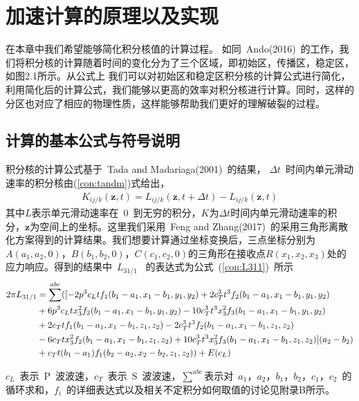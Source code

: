 
\chapter{加速计算的原理以及实现}
    \indent 在本章中我们希望能够简化积分核值的计算过程。 如同~Ando(2016)~的工作，我们将积分核的计算随着时间的变化分为了三个区域，即初始区，传播区，稳定区，如图2.1所示。从公式上 我们可以对初始区和稳定区积分核的计算公式进行简化，利用简化后的计算公式，我们能够以更高的效率对积分核进行计算。同时，这样的分区也对应了相应的物理性质，这样能够帮助我们更好的理解破裂的过程。
	\section{计算的基本公式与符号说明}
   \indent 积分核的计算公式基于~Tada and Madariaga(2001)~的结果， $\Delta t$~时间内单元滑动速率的积分核由(\ref{con:tandm})式给出，
        \begin{align} \label{con:tandm}
              K_{ij/k}(\textbf{z},t)=L_{ij/k}(\textbf{z},t+\Delta t)-L_{ij/k}(\textbf{z},t)
         \end{align}
    其中$L$表示单元滑动速率在~0~到无穷的积分，$K$为$\Delta t$时间内单元滑动速率的积分，$\textbf{z}$为空间上的坐标。这里我们采用~Feng and Zhang(2017)~的采用三角形离散化方案得到的计算结果。我们想要计算通过坐标变换后，三点坐标分别为$A(a_{1},a_{2},0)$，$B(b_{1},b_{2},0)$，$C(c_{1},c_{2},0)$的三角形在接收点$R(x_{1},x_{2},x_{3})$处的应力响应。得到的结果中~$L_{31/1}$~ 的表达式为公式~(\ref{con:L311})~所示
        \begin{align} \notag
          2\pi L_{31/1} &= \sum^{abc}([-2p^{3}c_{L}tf_{1}(b_{1}-a_{1},x_{1}-b_{1},y_{1},y_{2}) + 2c_{T}^{3}t^{3}f_{2}(b_{1} - a_{1},x_{1}-b_{1},y_{1},y_{2})\\
         & \notag +  6p^{3}c_{L}tx_{3}^{2}f_{2}(b_{1} - a_{1},x_{1} - b_{1},y_{1},y_{2})- 10c_{T}^{3}t^{3}x_{3}^{2}f_{3}(b_{1}-a_{1},x_{1}-b_{1},y_{1},y_{2})\\
         &\notag + 2c_{T}tf_{1}(b_{1}-a_{1},x_{1}-b_{1},z_{1},z_{2}) - 2c_{T}^{3}t^{3}f_{2}(b_{1}-a_{1},x_{1}-b_{1},z_{1},z_{2})\\
         &\notag - 6c_{T}tx_{3}^{2}f_{2}(b_{1}-a_{1},x_{1}-b_{1},z_{1},z_{2})+ 10c_{T}^{3}t^{3}x_{3}^{2}f_{3}(b_{1}-a_{1},x_{1}-b_{1},z_{1},z_{2})](a_{2}-b_{2}) \\
         & + c_{T}t(b_{1}-a_{1})f_{1}(b_{2}-a_{2},x_{2}-b_{2},z_{1},z_{2})  ) + E(c_{L})\label{con:L311}
         \end{align}
         
        \noindent $c_{L}$~表示~P~波波速，$c_{T}$~表示~S~波波速，$\sum^{abc}$表示对~$a_{1}$，$a_{2}$，$b_{1}$，$b_{2}$，$c_{1}$，$c_{2}$~的循环求和，$f_{i}$~的详细表达式以及相关不定积分如何取值的讨论见附录B所示。



